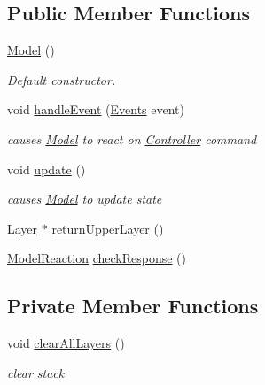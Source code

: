 \subsection*{Public Member Functions}
\begin{DoxyCompactItemize}
\item 
\mbox{\label{class_model_ae3b375de5f6df4faf74a95d64748e048}} 
\hyperlink{class_model_ae3b375de5f6df4faf74a95d64748e048}{Model} ()
\begin{DoxyCompactList}\small\item\em Default constructor. \end{DoxyCompactList}\item 
void \hyperlink{class_model_a2b3b7cbe02e7cac025290136e4c11e54}{handle\+Event} (\hyperlink{_events_8h_af60e00b78607064c5be6aa9397ea49c1}{Events} event)
\begin{DoxyCompactList}\small\item\em causes \hyperlink{class_model}{Model} to react on \hyperlink{class_controller}{Controller} command \end{DoxyCompactList}\item 
\mbox{\label{class_model_a8976f84f757eb3cd68b2aa7eeb5a345f}} 
void \hyperlink{class_model_a8976f84f757eb3cd68b2aa7eeb5a345f}{update} ()
\begin{DoxyCompactList}\small\item\em causes \hyperlink{class_model}{Model} to update state \end{DoxyCompactList}\item 
\hyperlink{class_layer}{Layer} $\ast$ \hyperlink{class_model_acdaa9cd882c6f43d0ea60bc7010acfa2}{return\+Upper\+Layer} ()
\item 
\hyperlink{_events_8h_a387f1fc6b8a0efa93d5fed71c3d9c0bc}{Model\+Reaction} \hyperlink{class_model_aabbd887291832c912bc39487f829fb9a}{check\+Response} ()
\end{DoxyCompactItemize}
\subsection*{Private Member Functions}
\begin{DoxyCompactItemize}
\item 
\mbox{\label{class_model_a3ad6a6d48906c82bc5ef7ff0ad00b190}} 
void \hyperlink{class_model_a3ad6a6d48906c82bc5ef7ff0ad00b190}{clear\+All\+Layers} ()
\begin{DoxyCompactList}\small\item\em clear stack \end{DoxyCompactList}\end{DoxyCompactItemize}
